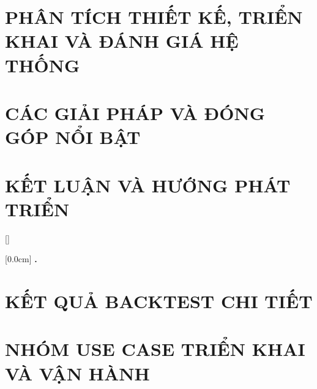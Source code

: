 \documentclass[a4paper,13pt,3p,oneside]{report}
\renewcommand{\bibname}{Danh_sach_tai_lieu_tham_khao}
\theoremstyle{definition}
\begin{document}
\newpage
\chapter{PHÂN TÍCH THIẾT KẾ, TRIỂN KHAI VÀ ĐÁNH GIÁ HỆ THỐNG}
\label{chapter:Experiment}


\newpage
\chapter{CÁC GIẢI PHÁP VÀ ĐÓNG GÓP NỔI BẬT}
\label{chapter:SolutionAndContribution}

\newpage
\chapter{KẾT LUẬN VÀ HƯỚNG PHÁT TRIỂN} %
\label{chapter:conclusion}


\newpage
\renewcommand\bibname{TÀI LIỆU THAM KHẢO}
\printbibliography
{}

\appendixpage
\appendices
\addappheadtotoc


{}[]
\titlespacing*{\chapter}{0pt}{-20pt}{20pt}

    [0.0cm]             %
    {\bfseries\vspace{0.3cm}}                  %
    {{\bfseries{\scshape} \thecontentslabel.\ }} %
    {}         %
    {\contentspage}         %
\chapter{KẾT QUẢ BACKTEST CHI TIẾT}

\newpage
\chapter{NHÓM USE CASE TRIỂN KHAI VÀ VẬN HÀNH}
\label{chapter:appendixB}

\end{document}
